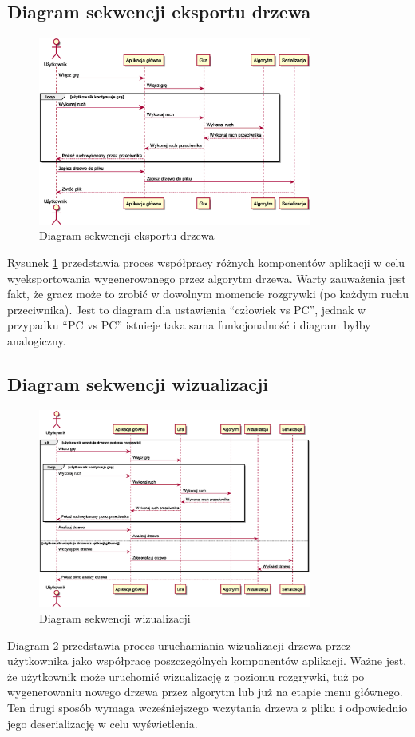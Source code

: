 \documentclass{article}
\begin{document}
	\subsection{Diagram sekwencji eksportu drzewa}
	\begin{figure}[h]
		\centering
		\includegraphics[width=0.8\textwidth]{serialize_sequence}
		\caption{Diagram sekwencji eksportu drzewa}
		\label{rys:sequenceserialize}
	\end{figure}
	\noindent Rysunek \ref{rys:sequenceserialize} przedstawia proces współpracy różnych komponentów aplikacji w celu wyeksportowania wygenerowanego przez algorytm drzewa. Warty zauważenia jest fakt, że gracz może to zrobić w dowolnym momencie rozgrywki (po każdym ruchu przeciwnika). Jest to diagram dla ustawienia ``człowiek vs PC'', jednak w przypadku ``PC vs PC'' istnieje taka sama funkcjonalność i diagram byłby analogiczny.
	
	\clearpage
	\subsection{Diagram sekwencji wizualizacji}
	\begin{figure}[h]
		\centering
		\includegraphics[width=0.8\textwidth]{visualization_sequence}
		\caption{Diagram sekwencji wizualizacji}
		\label{rys:sequencevisualise}
	\end{figure}
	\noindent Diagram \ref{rys:sequencevisualise} przedstawia proces uruchamiania wizualizacji drzewa przez użytkownika jako współpracę poszczególnych komponentów aplikacji. Ważne jest, że użytkownik może uruchomić wizualizację z poziomu rozgrywki, tuż po wygenerowaniu nowego drzewa przez algorytm lub już na etapie menu głównego. Ten drugi sposób wymaga wcześniejszego wczytania drzewa z pliku i odpowiednio jego deserializację w celu wyświetlenia.
	
\end{document}
